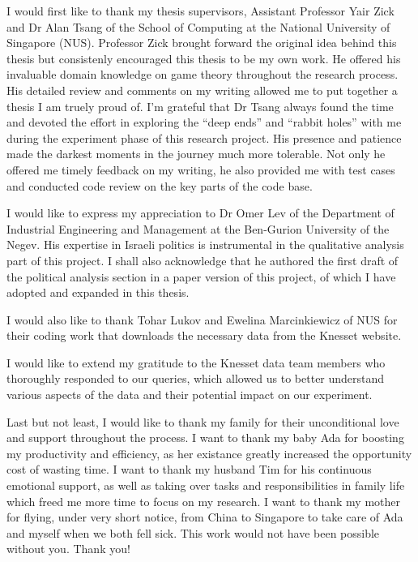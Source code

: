 \begin{acknowledgments}
  I would first like to thank my thesis supervisors, Assistant Professor
  Yair Zick and Dr Alan Tsang of the School of Computing at the National
  University of Singapore (NUS).
  Professor Zick brought forward the original idea behind this thesis but
  consistenly encouraged this thesis to be my own work.
  He offered his invaluable domain knowledge on game theory throughout the
  research process.
  His detailed review and comments on my writing allowed me to put together
  a thesis I am truely proud of.
  I'm grateful that Dr Tsang always found the time and devoted the effort in
  exploring the ``deep ends'' and ``rabbit holes'' with me during the
  experiment phase of this research project.
  His presence and patience made the darkest moments in the journey much more
  tolerable.
  Not only he offered me timely feedback on my writing, he also provided me
  with test cases and conducted code review on the key parts of the code base.

  I would like to express my appreciation to Dr Omer Lev of the Department of
  Industrial Engineering and Management at the Ben-Gurion University of the
  Negev.
  His expertise in Israeli politics is instrumental in the qualitative analysis
  part of this project.
  I shall also acknowledge that he authored the first draft of the political
  analysis section in a paper version of this project, of which I have adopted
  and expanded in this thesis.

  I would also like to thank Tohar Lukov and Ewelina Marcinkiewicz of NUS for
  their coding work that downloads the necessary data from the Knesset website.

  I would like to extend my gratitude to the Knesset data team members who
  thoroughly responded to our queries, which allowed us to better understand
  various aspects of the data and their potential impact on our experiment.

  Last but not least, I would like to thank my family for their unconditional
  love and support throughout the process.
  I want to thank my baby Ada for boosting my productivity and efficiency, as
  her existance greatly increased the opportunity cost of wasting time.
  I want to thank my husband Tim for his continuous emotional support, as well
  as taking over tasks and responsibilities in family life which freed me more
  time to focus on my research.
  I want to thank my mother for flying, under very short notice, from China to
  Singapore to take care of Ada and myself when we both fell sick.
  This work would not have been possible without you. Thank you!

\end{acknowledgments}

